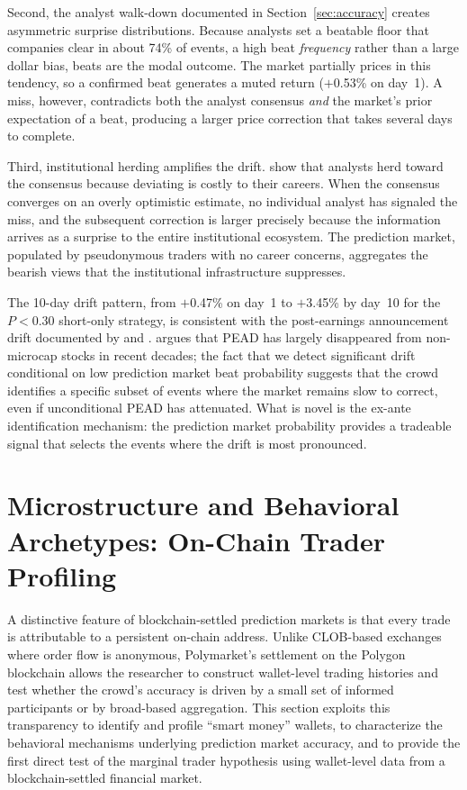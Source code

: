 \documentclass[11pt]{article}
\begin{document}
Second, the analyst walk-down documented in Section~\ref{sec:accuracy} creates asymmetric surprise distributions. Because analysts set a beatable floor that companies clear in about 74\% of events, a high beat \textit{frequency} rather than a large dollar bias, beats are the modal outcome. The market partially prices in this tendency, so a confirmed beat generates a muted return ($+$0.53\% on day~1). A miss, however, contradicts both the analyst consensus \textit{and} the market's prior expectation of a beat, producing a larger price correction that takes several days to complete.

Third, institutional herding amplifies the drift. \citet{hong2000security} show that analysts herd toward the consensus because deviating is costly to their careers. When the consensus converges on an overly optimistic estimate, no individual analyst has signaled the miss, and the subsequent correction is larger precisely because the information arrives as a surprise to the entire institutional ecosystem. The prediction market, populated by pseudonymous traders with no career concerns, aggregates the bearish views that the institutional infrastructure suppresses.

The 10-day drift pattern, from $+$0.47\% on day~1 to $+$3.45\% by day~10 for the $P < 0.30$ short-only strategy, is consistent with the post-earnings announcement drift documented by \citet{bernard1989post} and \citet{livnat2006comparing}. \citet{martineau2022pead} argues that PEAD has largely disappeared from non-microcap stocks in recent decades; the fact that we detect significant drift conditional on low prediction market beat probability suggests that the crowd identifies a specific subset of events where the market remains slow to correct, even if unconditional PEAD has attenuated. What is novel is the ex-ante identification mechanism: the prediction market probability provides a tradeable signal that selects the events where the drift is most pronounced.

\section{Microstructure and Behavioral Archetypes: On-Chain Trader Profiling} \label{sec:micro}

A distinctive feature of blockchain-settled prediction markets is that every trade is attributable to a persistent on-chain address. Unlike CLOB-based exchanges where order flow is anonymous, Polymarket's settlement on the Polygon blockchain allows the researcher to construct wallet-level trading histories and test whether the crowd's accuracy is driven by a small set of informed participants or by broad-based aggregation. This section exploits this transparency to identify and profile ``smart money'' wallets, to characterize the behavioral mechanisms underlying prediction market accuracy, and to provide the first direct test of the marginal trader hypothesis \citep{forsythe1992anatomy} using wallet-level data from a blockchain-settled financial market.
\end{document}
